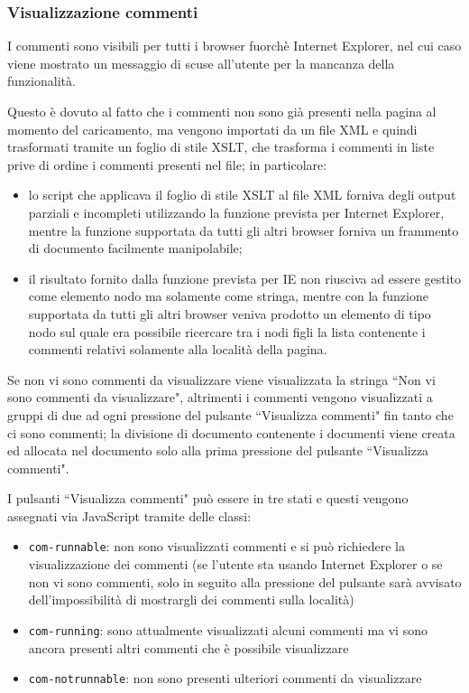 \subsubsection{Visualizzazione commenti}\label{sec:visComm}
I commenti sono visibili per tutti i browser fuorchè Internet Explorer, nel
cui caso viene mostrato un messaggio di scuse all'utente per la mancanza della
funzionalità.

Questo è dovuto al fatto che i commenti non sono già presenti nella pagina al
momento del caricamento, ma vengono importati da un file XML e quindi
trasformati tramite un foglio di stile XSLT, che trasforma i commenti in liste
prive di ordine i commenti presenti nel file; in particolare:
\begin{itemize}
\item lo script che applicava il foglio di stile XSLT al file XML forniva
degli output parziali e incompleti utilizzando la funzione prevista per
Internet Explorer, mentre la funzione supportata da tutti gli altri browser
forniva un frammento di documento facilmente manipolabile;
\item il risultato fornito dalla funzione prevista per IE non riusciva ad
essere gestito come elemento nodo ma solamente come stringa, mentre con
la funzione supportata da tutti gli altri browser veniva prodotto un elemento
di tipo nodo sul quale era possibile ricercare tra i nodi figli la lista
contenente i commenti relativi solamente alla località della pagina.
\end{itemize}

Se non vi sono commenti da visualizzare viene visualizzata la stringa
``Non vi sono commenti da visualizzare", altrimenti i commenti vengono
visualizzati a gruppi di due ad ogni pressione del pulsante
``Visualizza commenti" fin tanto che ci sono commenti; la divisione di
documento contenente i documenti viene creata ed allocata nel documento solo
alla prima pressione del pulsante ``Visualizza commenti".

I pulsanti ``Visualizza commenti" può essere in tre stati e questi vengono
assegnati via JavaScript tramite delle classi:
\begin{itemize}
\item \texttt{com-runnable}: non sono visualizzati commenti e si può
richiedere la visualizzazione dei commenti (se l'utente sta usando
Internet Explorer o se non vi sono commenti, solo in seguito alla pressione
del pulsante sarà avvisato dell'impossibilità di mostrargli dei commenti sulla
località)
\item \texttt{com-running}: sono attualmente visualizzati alcuni commenti ma vi
sono ancora presenti altri commenti che è possibile visualizzare
\item \texttt{com-notrunnable}: non sono presenti ulteriori commenti da
visualizzare
\end{itemize}

